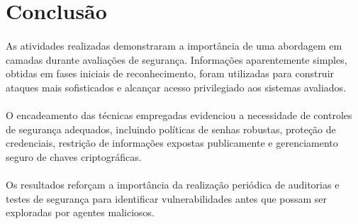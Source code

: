 \section{Conclusão}

\paragraph{}
As atividades realizadas demonstraram a importância de uma abordagem em camadas
durante avaliações de segurança. Informações aparentemente simples, obtidas em
fases iniciais de reconhecimento, foram utilizadas para construir ataques mais
sofisticados e alcançar acesso privilegiado aos sistemas avaliados.

\paragraph{}
O encadeamento das técnicas empregadas evidenciou a necessidade de controles de
segurança adequados, incluindo políticas de senhas robustas, proteção de
credenciais, restrição de informações expostas publicamente e gerenciamento
seguro de chaves criptográficas.

\paragraph{}
Os resultados reforçam a importância da realização periódica de auditorias e
testes de segurança para identificar vulnerabilidades antes que possam ser
exploradas por agentes maliciosos.
